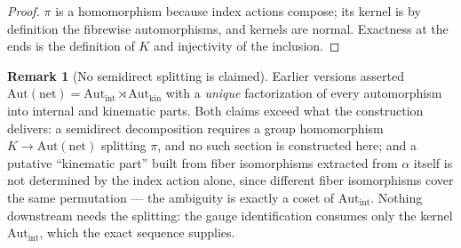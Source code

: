 \documentclass[11pt]{article}
\theoremstyle{definition}
\newtheorem{remark}[theorem]{Remark}
\begin{document}
\begin{proof}
$\pi$ is a homomorphism because index actions compose; its kernel is by
definition the fibrewise automorphisms, and kernels are normal.
Exactness at the ends is the definition of $K$ and injectivity of the
inclusion.
\end{proof}

\begin{remark}[No semidirect splitting is claimed]\label{rem:no_splitting}
Earlier versions asserted
$\mathrm{Aut}(\text{net}) = \mathrm{Aut}_{\mathrm{int}} \rtimes
\mathrm{Aut}_{\mathrm{kin}}$ with a \emph{unique} factorization of every
automorphism into internal and kinematic parts.  Both claims exceed what
the construction delivers: a semidirect decomposition requires a group
homomorphism $K \to \mathrm{Aut}(\text{net})$ splitting $\pi$, and no
such section is constructed here; and a putative ``kinematic part''
built from fiber isomorphisms extracted from $\alpha$ itself is not
determined by the index action alone, since different fiber
isomorphisms cover the same permutation --- the ambiguity is exactly a
coset of $\mathrm{Aut}_{\mathrm{int}}$.  Nothing downstream needs the
splitting: the gauge identification consumes only the kernel
$\mathrm{Aut}_{\mathrm{int}}$, which the exact sequence supplies.
\end{remark}
\end{document}
